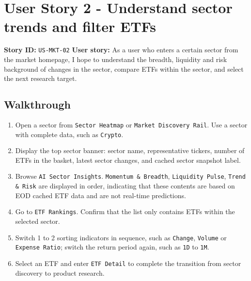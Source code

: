 \section{User Story 2 - Understand sector trends and filter ETFs}
\textbf{Story ID:} \texttt{US-MKT-02}
\textbf{User story:} As a user who enters a certain sector from the market homepage, I hope to understand the breadth, liquidity and risk background of changes in the sector, compare ETFs within the sector, and select the next research target.
\subsection{Walkthrough}
\begin{enumerate}
\item Open a sector from \texttt{Sector Heatmap} or \texttt{Market Discovery Rail}. Use a sector with complete data, such as \texttt{Crypto}.
\item Display the top sector banner: sector name, representative tickers, number of ETFs in the basket, latest sector changes, and cached sector snapshot label.
\item Browse \texttt{AI Sector Insights}. \texttt{Momentum \& Breadth}, \texttt{Liquidity Pulse}, \texttt{Trend \& Risk} are displayed in order, indicating that these contents are based on EOD cached ETF data and are not real-time predictions.
\item Go to \texttt{ETF Rankings}. Confirm that the list only contains ETFs within the selected sector.
\item Switch 1 to 2 sorting indicators in sequence, such as \texttt{Change}, \texttt{Volume} or \texttt{Expense Ratio}; switch the return period again, such as \texttt{1D} to \texttt{1M}.
\item Select an ETF and enter \texttt{ETF Detail} to complete the transition from sector discovery to product research.
\end{enumerate}
